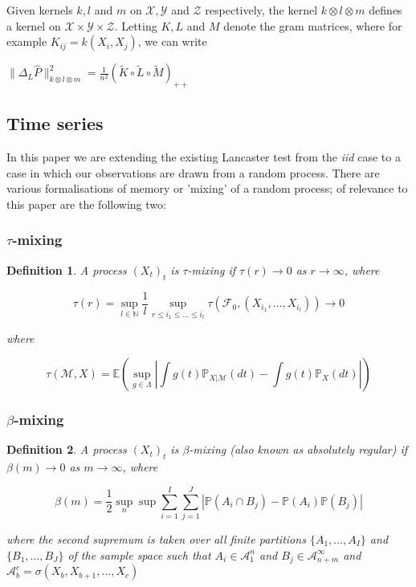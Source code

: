 \documentclass{article}
\newtheorem{definition}{Definition}
\begin{document}
Given kernels $k,l$ and $m$ on $\mathcal{X},\mathcal{Y}$ and $\mathcal{Z}$ respectively, the kernel $k\otimes l \otimes m$ defines a kernel on $\mathcal{X}\times \mathcal{Y} \times \mathcal{Z}$. Letting $K, L$ and $M$ denote the gram matrices, where for example $K_{ij} = k(X_i,X_j)$, we can write

$\|\Delta_L\hat{P}\|_{k\otimes l \otimes m}^2 = \frac{1}{n^2}\left(\tilde{K}\circ\tilde{L}\circ\tilde{M}\right)_{++}$

\subsection{Time series}
In this paper we are extending the existing Lancaster test from the \emph{iid} case to a case in which our observations are drawn from a random process. There are various formalisations of memory or 'mixing' of a random process; of relevance to this paper are the following two:

\subsubsection{$\tau$-mixing}
\begin{definition}
A process $(X_t)_{t}$ is \emph{$\tau$-mixing} if $\tau(r) \longrightarrow 0$ as $r\longrightarrow \infty$, where

\[\tau(r) = \sup_{l\in \mathbb{N}} \frac{1}{l} \sup_{r\leq i_1 \leq \ldots \leq i_l} \tau(\mathcal{F}_0,(X_{i_1}, \ldots, X_{i_l})) \longrightarrow 0\]

where

\[ \tau(\mathcal{M},X) = \mathbb{E} (\sup_{g \in \Lambda} | \int g(t) \mathbb{P}_{X|\mathcal{M}}(dt) -  \int g(t) \mathbb{P}_{X}(dt) |)\]

\end{definition}

\subsubsection{$\beta$-mixing}


\begin{definition}
A process $(X_t)_{t}$ is \emph{$\beta$-mixing} (also known as \emph{absolutely regular}) if $\beta(m) \longrightarrow 0$ as $m\longrightarrow \infty$, where

\[ \beta(m) = \frac{1}{2} \sup_n \sup \sum_{i=1}^I \sum_{j=1}^J | \mathbb{P}(A_i \cap B_j) - \mathbb{P}(A_i)\mathbb{P}(B_j)| \]

where the second supremum is taken  over all finite partitions $\{A_1,\ldots, A_I \}$ and  $\{B_1,\ldots, B_J\}$ of the sample space such that $A_i \in \mathcal{A}_1^n$ and $B_j \in \mathcal{A}_{n+m}^\infty$ and $\mathcal{A}_b^c = \sigma(X_b,X_{b+1},\ldots,X_{c})$
\end{definition}
\end{document}

